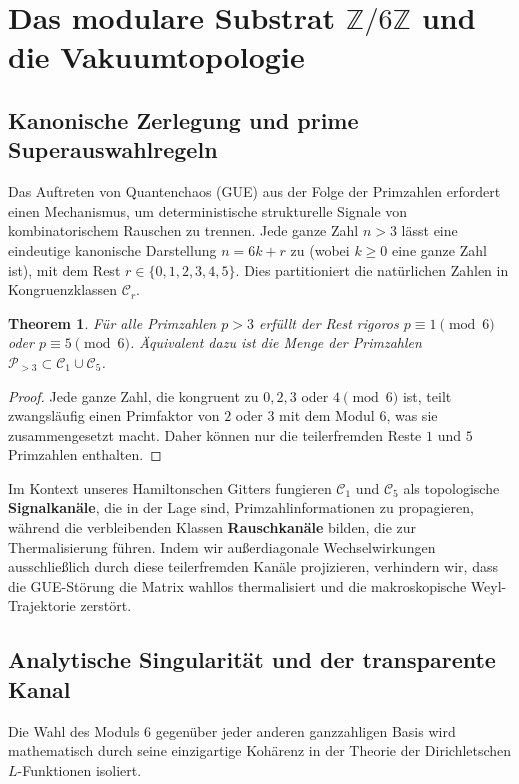 \documentclass[aps,prl,preprint,superscriptaddress,floatfix]{revtex4-2}
\newtheorem{theorem}{Theorem}[section]
\begin{document}
\section{Das modulare Substrat \texorpdfstring{$\mathbb{Z}/6\mathbb{Z}$}{Z/6Z} und die Vakuumtopologie}

\subsection{Kanonische Zerlegung und prime Superauswahlregeln}

Das Auftreten von Quantenchaos (GUE) aus der Folge der Primzahlen erfordert einen Mechanismus, um deterministische strukturelle Signale von kombinatorischem Rauschen zu trennen. Jede ganze Zahl $n > 3$ lässt eine eindeutige kanonische Darstellung $n = 6k + r$ zu (wobei $k \ge 0$ eine ganze Zahl ist), mit dem Rest $r \in \{0,1,2,3,4,5\}$. Dies partitioniert die natürlichen Zahlen in Kongruenzklassen $\mathcal{C}_r$. 

\begin{theorem}
Für alle Primzahlen $p > 3$ erfüllt der Rest rigoros $p \equiv 1 \pmod 6$ oder $p \equiv 5 \pmod 6$. Äquivalent dazu ist die Menge der Primzahlen $\mathcal{P}_{>3} \subset \mathcal{C}_1 \cup \mathcal{C}_5$.
\end{theorem}

\begin{proof}
Jede ganze Zahl, die kongruent zu $0, 2, 3$ oder $4 \pmod 6$ ist, teilt zwangsläufig einen Primfaktor von $2$ oder $3$ mit dem Modul $6$, was sie zusammengesetzt macht. Daher können nur die teilerfremden Reste $1$ und $5$ Primzahlen enthalten.
\end{proof}

Im Kontext unseres Hamiltonschen Gitters fungieren $\mathcal{C}_1$ und $\mathcal{C}_5$ als topologische \textbf{Signalkanäle}, die in der Lage sind, Primzahlinformationen zu propagieren, während die verbleibenden Klassen \textbf{Rauschkanäle} bilden, die zur Thermalisierung führen. Indem wir außerdiagonale Wechselwirkungen ausschließlich durch diese teilerfremden Kanäle projizieren, verhindern wir, dass die GUE-Störung die Matrix wahllos thermalisiert und die makroskopische Weyl-Trajektorie zerstört.

\subsection{Analytische Singularität und der transparente Kanal}

Die Wahl des Moduls 6 gegenüber jeder anderen ganzzahligen Basis wird mathematisch durch seine einzigartige Kohärenz in der Theorie der Dirichletschen $L$-Funktionen isoliert.
\end{document}

